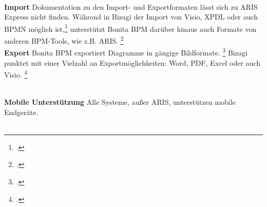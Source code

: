 \\
\textbf{Import} Dokumentation zu den Import- und Exportformaten lässt sich zu
ARIS Express nicht finden. Während in Bizagi der Import von Visio, XPDL oder
auch BPMN möglich ist,\footcite{bizagiimport} unterstützt Bonita BPM darüber
hinaus auch Formate von anderen BPM-Tools, wie z.B. ARIS.
\footcite{bonitaimportexport}
\\
\textbf{Export} Bonita BPM exportiert Diagramme in gängige Bildformate.
\footcite{bonitaimportexport} Bizagi punktet mit einer Vielzahl an
Exportmöglichkeiten: Word, PDF, Excel oder auch Visio.
\footcite{bizagiexport}

\begin{figure}[H]
\begin{minipage}{\linewidth}
\begin{center}
\end{center}
\end{minipage}
\end{figure}


\\
\textbf{Mobile Unterstützung} Alle Systeme, außer ARIS, unterstützen mobile
Endgeräte.
\\
\\

